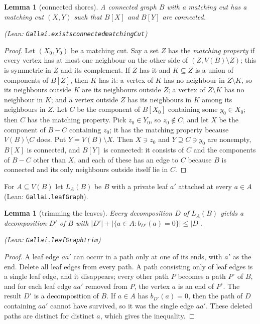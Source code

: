 \documentclass[11pt]{amsart}
\newtheorem{lemma}[theorem]{Lemma}
\theoremstyle{definition}
\theoremstyle{remark}
\renewcommand{\_}{\oldunderscore\allowbreak}
\newcommand{\lean}[1]{\textup{(Lean: {\small\texttt{#1}})}}
\newcommand{\leanst}[1]{\par{\raggedright\small\textup{(Lean: \texttt{#1})}\par}}
\begin{document}
\begin{lemma}[connected shores]\label{lem:shores}
A connected graph $B$ with a matching cut has a matching cut $(X,Y)$ such that $B[X]$ and $B[Y]$ are
connected.
\leanst{Gallai.exists\_connected\_matchingCut}
\end{lemma}

\begin{proof}
Let $(X_0,Y_0)$ be a matching cut. Say a set $Z$ has the \emph{matching property} if every vertex has
at most one neighbour on the other side of $(Z,V(B)\setminus Z)$; this is symmetric in $Z$ and its
complement. If $Z$ has it and $K\subseteq Z$ is a union of components of $B[Z]$, then $K$ has it: a
vertex of $K$ has no neighbour in $Z\setminus K$, so its neighbours outside $K$ are its neighbours
outside $Z$; a vertex of $Z\setminus K$ has no neighbour in $K$; and a vertex outside $Z$ has its
neighbours in $K$ among its neighbours in $Z$. Let $C$ be the component of $B[X_0]$ containing some
$y_0\in X_0$; then $C$ has the matching property. Pick $z_0\in Y_0$, so $z_0\notin C$, and let $X$ be
the component of $B-C$ containing $z_0$; it has the matching property because $V(B)\setminus C$
does. Put $Y=V(B)\setminus X$. Then $X\ni z_0$ and $Y\supseteq C\ni y_0$ are nonempty, $B[X]$ is
connected, and $B[Y]$ is connected: it consists of $C$ and the components of $B-C$ other than $X$,
and each of these has an edge to $C$ because $B$ is connected and its only neighbours outside itself
lie in $C$.
\end{proof}

For $A\subseteq V(B)$ let $L_A(B)$ be $B$ with a private leaf $a'$ attached at every $a\in A$
\lean{Gallai.leafGraph}.

\begin{lemma}[trimming the leaves]\label{lem:trimleaves}
Every decomposition $D$ of $L_A(B)$ yields a decomposition $D'$ of $B$ with
$|D'|+|\{a\in A:b_{D'}(a)=0\}|\le|D|$.
\leanst{Gallai.leafGraph\_trim}
\end{lemma}

\begin{proof}
A leaf edge $aa'$ can occur in a path only at one of its ends, with $a'$ as the end. Delete all leaf
edges from every path. A path consisting only of leaf edges is a single leaf edge, and it disappears;
every other path $P$ becomes a path $P^\circ$ of $B$, and for each leaf edge $aa'$ removed from $P$,
the vertex $a$ is an end of $P^\circ$. The result $D'$ is a decomposition of $B$. If $a\in A$ has
$b_{D'}(a)=0$, then the path of $D$ containing $aa'$ cannot have survived, so it was the single edge
$aa'$. These deleted paths are distinct for distinct $a$, which gives the inequality.
\end{proof}
\end{document}
